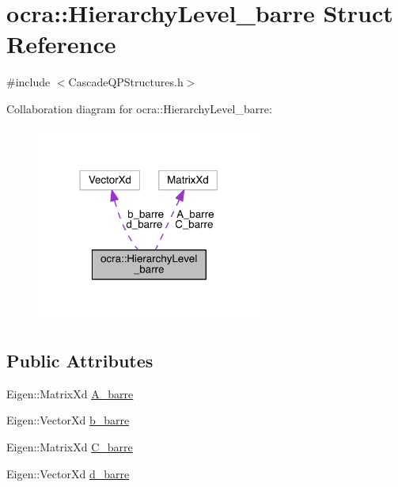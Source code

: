 \hypertarget{structocra_1_1HierarchyLevel__barre}{}\section{ocra\+:\+:Hierarchy\+Level\+\_\+barre Struct Reference}
\label{structocra_1_1HierarchyLevel__barre}


{\ttfamily \#include $<$Cascade\+Q\+P\+Structures.\+h$>$}



Collaboration diagram for ocra\+:\+:Hierarchy\+Level\+\_\+barre\+:\nopagebreak
\begin{figure}[H]
\begin{center}
\leavevmode
\includegraphics[width=210pt]{d4/d3c/structocra_1_1HierarchyLevel__barre__coll__graph}
\end{center}
\end{figure}
\subsection*{Public Attributes}
\begin{DoxyCompactItemize}
\item 
Eigen\+::\+Matrix\+Xd \hyperlink{structocra_1_1HierarchyLevel__barre_a9e0797af20a5547e4c7b88d648e9a152}{A\+\_\+barre}
\item 
Eigen\+::\+Vector\+Xd \hyperlink{structocra_1_1HierarchyLevel__barre_a4b34116dea6da686e3b491a673adabde}{b\+\_\+barre}
\item 
Eigen\+::\+Matrix\+Xd \hyperlink{structocra_1_1HierarchyLevel__barre_a3d60346fbdc2ff5c366b6b5f7b802af1}{C\+\_\+barre}
\item 
Eigen\+::\+Vector\+Xd \hyperlink{structocra_1_1HierarchyLevel__barre_a65cc4a8fa90c825809493c2bbc921a3d}{d\+\_\+barre}
\end{DoxyCompactItemize}


